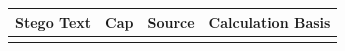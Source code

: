\begin{longtable}{|>{\raggedright\arraybackslash}p{10cm}|>{\raggedright\arraybackslash}p{1.2cm}|>{\raggedright\arraybackslash}p{1cm}|>{\raggedright\arraybackslash}p{2cm}|}
  \textbf{Stego Text}                                                                                                                                                                                                                                                                                                                                                                                                                                                                                                                                                                                                                                                                                                                                                                                                                                                                                                                                                                                                                                                                                                                                                                                                                                                                                                                                                                                                                                                                                                                                                                                                                                                                                                                                                                                                                                                                                                                                                                                                                                                                                                                                                                                                                                                     & \textbf{Cap} & \textbf{Source} & \textbf{Calculation Basis}                             \\ \hline
  \endhead
  \hline
  \endfoot
  \endlastfoot


\end{longtable}
